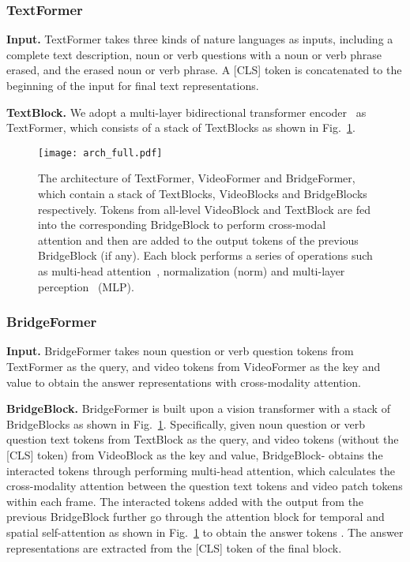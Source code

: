 \documentclass[10pt,twocolumn,letterpaper]{article}
\begin{document}
\subsubsection{TextFormer}
{\flushleft \bf Input.} TextFormer takes three kinds of nature languages as inputs, including a complete text description, noun or verb questions with a noun or verb phrase erased, and the erased noun or verb phrase. A [CLS] token is concatenated to the beginning of the input for final text representations.

{\flushleft \bf TextBlock.} We adopt a multi-layer bidirectional transformer encoder~\cite{distilbert} as TextFormer, which consists of a stack of TextBlocks as shown in Fig.~\ref{fig:architecture}. 

\begin{figure}
	\centering
	\texttt{[image: arch\_full.pdf]}
	\caption{The architecture of TextFormer, VideoFormer and BridgeFormer, which contain a stack of TextBlocks,
	VideoBlocks and BridgeBlocks respectively. Tokens from all-level VideoBlock and TextBlock are fed into the corresponding
	BridgeBlock to perform cross-modal attention and then are added to the output tokens of the previous BridgeBlock (if any). Each block performs a series of operations such as multi-head attention~\cite{vit}, normalization (norm) and multi-layer perception~\cite{bert} (MLP).}
	\vspace{-4mm}	
	\label{fig:architecture}
\end{figure}

\subsubsection{BridgeFormer}
{\flushleft \bf Input.} BridgeFormer takes noun question or verb question tokens from TextFormer as the query, and video tokens from VideoFormer as the key and value to obtain the answer representations with cross-modality attention.

{\flushleft \bf BridgeBlock.} BridgeFormer is built upon a vision transformer with a stack of BridgeBlocks as shown in Fig.~\ref{fig:architecture}. Specifically, given noun question or verb question text tokens  from TextBlock as the query, and video tokens  (without the [CLS] token) from VideoBlock as the key and value, BridgeBlock- obtains the interacted tokens  through performing multi-head attention, which calculates the cross-modality attention between the question text tokens and video patch tokens within each frame. The interacted tokens  added with the output  from the previous BridgeBlock further go through the attention block for temporal and spatial self-attention as shown in Fig.~\ref{fig:architecture} to obtain the answer tokens . The answer representations are extracted from the [CLS] token of the final block.
\end{document}
